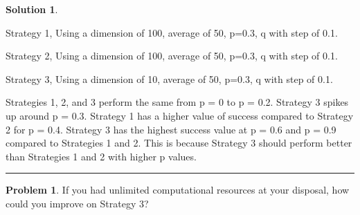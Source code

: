 \documentclass{article}
\theoremstyle{definition}
\newtheorem{problem}{Problem}
\def\fline{\rule{0.75\linewidth}{0.5pt}}
\newcommand{\finishline}{\vspace{-15pt}\begin{center}\fline\end{center}}
\newtheorem*{solution*}{Solution}
\newenvironment{solution}{\begin{solution*}}{{\finishline} \end{solution*}}
\begin{document}
\begin{solution} \hfill
    \begin{figure}[h]
	\centering
	\caption{} 
	\end{figure} 
	\begin{center}
	Strategy 1, Using a dimension of 100, average of 50, p=0.3, q with step of 0.1.
	
	Strategy 2, Using a dimension of 100, average of 50, p=0.3, q with step of 0.1.
	
	Strategy 3, Using a dimension of 10, average of 50, p=0.3, q with step of 0.1. 
    \end{center}
    
    Strategies 1, 2, and 3 perform the same from p = 0 to p = 0.2. Strategy 3 spikes up around p = 0.3. Strategy 1 has a higher value of success compared to Strategy 2 for p = 0.4. Strategy 3 has the highest success value at p = 0.6 and p = 0.9 compared to Strategies 1 and 2. This is because Strategy 3 should perform better than Strategies 1 and 2 with higher p values.
\end{solution}
\smallskip
\begin{problem}
	If you had unlimited computational resources at your disposal, how could you improve on Strategy 3? 
\end{problem}

\smallskip
\end{document}
